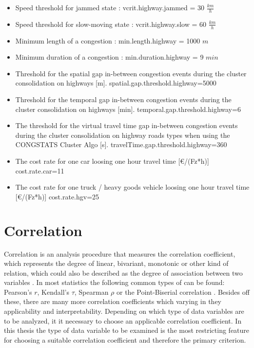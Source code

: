 \documentclass[a4paper,12pt]{report}
\begin{document}
\begin{itemize} %
	\item Speed threshold for jammed state : vcrit.highway.jammed = 30 $\frac{km}{h}$
	\item Speed threshold for slow-moving state : vcrit.highway.slow = 60 $\frac{km}{h}$
	\item Minimum length of a congestion : min.length.highway = 1000 $m$
	\item Minimum duration of a congestion : min.duration.highway = 9 $min$
	\item Threshold for the spatial gap in-between congestion events during the cluster consolidation on highways [m]. spatial.gap.threshold.highway=5000
	\item Threshold for the temporal gap in-between congestion events during the cluster consolidation on highways [min]. temporal.gap.threshold.highway=6
	\item The threshold for the virtual travel time gap in-between congestion events during the cluster consolidation on highway roads types when using the CONGSTATS Cluster Algo [s]. travelTime.gap.threshold.highway=360
\end{itemize}


\begin{itemize}
	\item The cost rate for one car loosing one hour travel time [€/(Fz*h)] cost.rate.car=11
	\item The cost rate for one truck / heavy goods vehicle loosing one hour travel time [€/(Fz*h)] cost.rate.hgv=25
\end{itemize}

\chapter{Correlation}
\label{definition_correlation}
Correlation is an analysis procedure that measures the correlation coefficient, which represents the degree of linear, bivariant, monotonic or other kind of relation, which could also be described as the degree of association between two variables \cite{HerzSchlicherSiegener1992}. In most statistics the following common types of can be found: Pearson's $r$, Kendall's $\tau$, Spearman  $\rho$ or the Point-Biserial correlation \cite{Ramzai2020,SPSS2020a,SPSS2020b}. Besides off these, there are many more correlation coefficients which varying in they applicability and interpretability. Depending on which type of data variables are to be analyzed, it it necessary to choose an applicable correlation coefficient. In this thesis the type of data variable to be examined is the most restricting feature for choosing a suitable correlation coefficient and therefore the primary criterion. 
\end{document}
